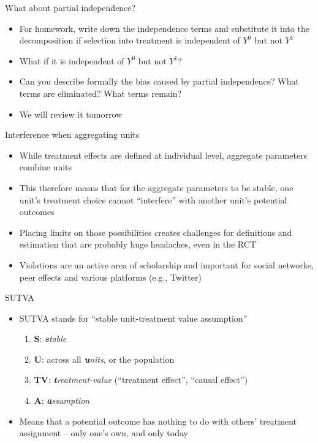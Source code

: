 \documentclass{beamer}
\begin{document}
\begin{frame}{What about partial independence?}

  \begin{itemize}
  \item For homework, write down the independence terms and substitute it into the decomposition if selection into treatment is independent of $Y^0$ but not $Y^1$
  \item What if it is independent of $Y^0$ but not $Y^1$?
  \item Can you describe formally the bias caused by partial independence?  What terms are eliminated?  What terms remain?
  \item We will review it tomorrow
  \end{itemize}
\end{frame}




\begin{frame}{Interference when aggregating units}

\begin{itemize}
\item While treatment effects are defined at individual level, aggregate parameters combine units
\item This therefore means that for the aggregate parameters to be stable, one unit's treatment choice cannot ``interfere'' with another unit's potential outcomes
\item Placing limits on those possibilities creates challenges for definitions and estimation that are probably huge headaches, even in the RCT
\item Violations are an active area of scholarship and important for social networks, peer effects and various platforms (e.g., Twitter)
\end{itemize}

\end{frame}

\begin{frame}{SUTVA}

  \begin{itemize}
    \item SUTVA stands for ``stable unit-treatment value assumption''
          \begin{enumerate}
            \item \textbf{S}: \emph{\textbf{s}table}
            \item \textbf{U}: across all \emph{\textbf{u}nits}, or the population
            \item \textbf{TV}: \emph{\textbf{t}reatment-value} (``treatment effect'', ``causal effect'')
            \item \textbf{A}: \emph{\textbf{a}ssumption}
          \end{enumerate}
    \item Means that a potential outcome has nothing to do with others' treatment assignment -- only one's own, and only today
  \end{itemize}
\end{frame}
\end{document}
